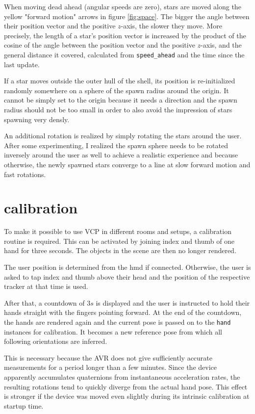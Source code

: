 \documentclass[hyperref, bachelorofscience]{cgvpub}
\begin{document}
When moving dead ahead (angular speeds are zero), stars are moved along the yellow "forward motion" arrows in figure \ref{fig:space}. The bigger the angle between their position vector and the positive $ z $-axis, the slower they move. More precisely, the length of a star's position vector is increased by the product of the cosine of the angle between the position vector and the positive $ z $-axis, and the general distance it covered, calculated from \lstinline|speed_ahead| and the time since the last update.

If a star moves outside the outer hull of the shell, its position is re-initialized randomly somewhere on a sphere of the spawn radius around the origin. It cannot be simply set to the origin because it needs a direction and the spawn radius should not be too small in order to also avoid the impression of stars spawning very densly.

An additional rotation is realized by simply rotating the stars around the user. After some experimenting, I realized the spawn sphere needs to be rotated inversely around the user as well to achieve a realistic experience and because otherwise, the newly spawned stars converge to a line at slow forward motion and fast rotations.

\section{calibration} \label{sec:cal}
To make it possible to use \gls{VCP} in different rooms and setups, a calibration routine is required. This can be activated by joining index and thumb of one hand for three seconds. The objects in the scene are then no longer rendered.

The user position is determined from the \acrshort{hmd} if connected. Otherwise, the user is asked to tap index and thumb above their head and the position of the respective tracker at that time is used.

After that, a countdown of $ 3s $ is displayed and the user is instructed to hold their hands straight with the fingers pointing forward. At the end of the countdown, the hands are rendered again and the current pose is passed on to the \lstinline|hand| instances for calibration. It becomes a new reference pose from which all following orientations are inferred. 

This is necessary because the \Gls{AVR} does not give sufficiently accurate measurements for a period longer than a few minutes. Since the device apparently accumulates quaternions from instantaneous acceleration rates, the resulting rotations tend to quickly diverge from the actual hand pose. This effect is stronger if the device was moved even slightly during its intrinsic calibration at startup time.
\end{document}
